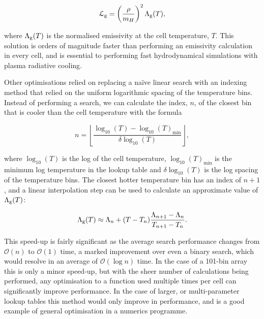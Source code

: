 \begin{equation}
  \mathcal{L}_\text{g} = \left(\frac{\rho}{m_H}\right)^2 \Lambda_\text{g} (T) ,
\end{equation}

\noindent
where $\Lambda_\text{g}(T)$ is the normalised emissivity at the cell temperature, $T$.
This solution is orders of magnitude faster than performing an emissivity calculation in every cell, and is essential to performing fast hydrodynamical simulations with plasma radiative cooling.

Other optimisations relied on replacing a na\"ive linear search with an indexing method that relied on the uniform logarithmic spacing of the temperature bins.
Instead of performing a search, we can calculate the index, $n$, of the closest bin that is cooler than the cell temperature with the formula

\begin{equation}
    \label{eq:logspaceemissivity}
    n = \left \lfloor \frac{\log_{10}(T) - \log_{10}(T)_\text{min}}{\delta \log_{10} (T)} \right \rfloor ,
\end{equation}

\noindent
where $\log_{10}(T)$ is the log of the cell temperature, $\log_{10} (T)_\text{min}$ is the minimum log temperature in the lookup table and $\delta \log_{10} (T)$ is the log spacing of the temperature bins.
The closest hotter temperature bin has an index of $n+1$, and a linear interpolation step can be used to calculate an approximate value of $\Lambda_\text{g}(T)$:

\begin{equation}
  \label{eq:logspaceinterpolate}
  \Lambda_\text{g}(T) \approx \Lambda_n + (T - T_n) \frac{\Lambda_{n+1} - \Lambda_n}{T_{n+1} - T_n} .
\end{equation}

This speed-up is fairly significant as the average search performance changes from $\mathcal{O}(n)$ to $\mathcal{O}(1)$ time, a marked improvement over even a binary search, which would resolve in an average of $\mathcal{O}(\log n)$ time.
In the case of a 101-bin array this is only a minor speed-up, but with the sheer number of calculations being performed, any optimisation to a function used multiple times per cell can significantly improve performance.
In the case of larger, or multi-parameter lookup tables this method would only improve in performance, and is a good example of general optimisation in a numerics programme.

